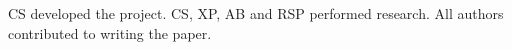 CS developed the project. CS, XP, AB and RSP performed research. All authors contributed to writing the paper.
